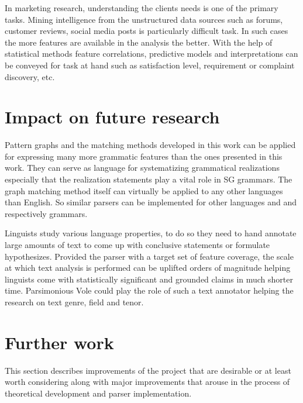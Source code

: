 In marketing research, understanding the clients needs is one of the primary tasks. Mining intelligence from the unstructured data sources such as forums, customer reviews, social media posts is particularly difficult task. In such cases the more features are available in the analysis the better. With the help of  statistical methods feature correlations, predictive models and interpretations can be conveyed for task at hand such as satisfaction level, requirement or complaint discovery, etc.

\section{Impact on future research}

Pattern graphs and the matching methods developed in this work can be applied for expressing many more grammatic features than the ones presented in this work. They can serve as language for systematizing grammatical realizations especially that the realization statements play a vital role in SG grammars. The graph matching method itself can virtually be applied to any other languages than English. So similar parsers can be implemented for other languages and and respectively grammars. 

Linguists study various language properties, to do so they need to hand annotate large amounts of text to come up with conclusive statements or formulate hypothesizes. Provided the parser with a target set of feature coverage, the scale at which text analysis is performed can be uplifted orders of magnitude helping linguists come with statistically significant and grounded claims in much shorter time. Parsimonious Vole could play the role of such a text annotator helping the research on text genre, field and tenor.



%
%
%
\section{Further work}
\label{sec:future-work}
This section describes improvements of the project that are desirable or at least worth considering along with major improvements that arouse in the process of theoretical development and parser implementation. 


